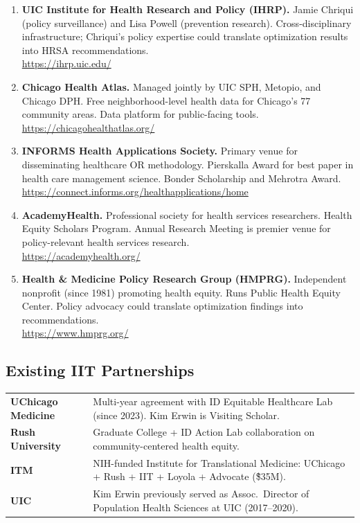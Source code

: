 \documentclass[11pt]{article}
\begin{document}
\begin{enumerate}
\item \textbf{UIC Institute for Health Research and Policy (IHRP).}
Jamie Chriqui (policy surveillance) and Lisa Powell (prevention research). Cross-disciplinary infrastructure; Chriqui's policy expertise could translate optimization results into HRSA recommendations. \\
\url{https://ihrp.uic.edu/}

\item \textbf{Chicago Health Atlas.}
Managed jointly by UIC SPH, Metopio, and Chicago DPH. Free neighborhood-level health data for Chicago's 77 community areas. Data platform for public-facing tools. \\
\url{https://chicagohealthatlas.org/}

\item \textbf{INFORMS Health Applications Society.}
Primary venue for disseminating healthcare OR methodology. Pierskalla Award for best paper in health care management science. Bonder Scholarship and Mehrotra Award. \\
\url{https://connect.informs.org/healthapplications/home}

\item \textbf{AcademyHealth.}
Professional society for health services researchers. Health Equity Scholars Program. Annual Research Meeting is premier venue for policy-relevant health services research. \\
\url{https://academyhealth.org/}

\item \textbf{Health \& Medicine Policy Research Group (HMPRG).}
Independent nonprofit (since 1981) promoting health equity. Runs Public Health Equity Center. Policy advocacy could translate optimization findings into recommendations. \\
\url{https://www.hmprg.org/}

\end{enumerate}

\subsection*{Existing IIT Partnerships}

\begin{tabular}{ll}
\textbf{UChicago Medicine} & Multi-year agreement with ID Equitable Healthcare Lab (since 2023). Kim Erwin is Visiting Scholar. \\
\textbf{Rush University} & Graduate College + ID Action Lab collaboration on community-centered health equity. \\
\textbf{ITM} & NIH-funded Institute for Translational Medicine: UChicago + Rush + IIT + Loyola + Advocate (\~\$35M). \\
\textbf{UIC} & Kim Erwin previously served as Assoc.\ Director of Population Health Sciences at UIC (2017--2020). \\
\end{tabular}
\end{document}
